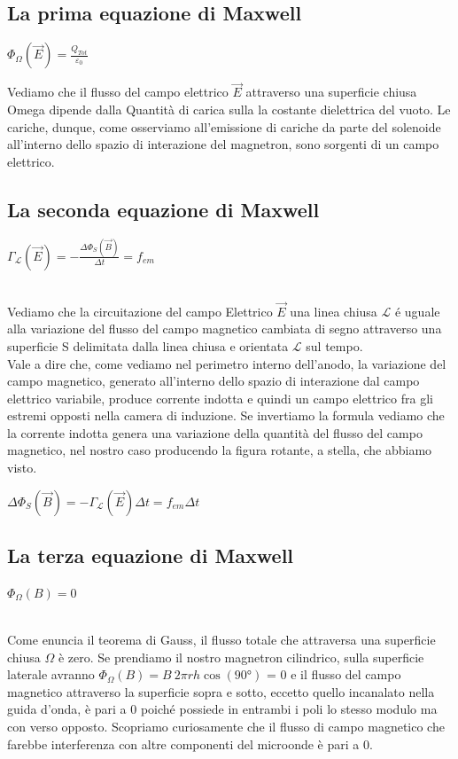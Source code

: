 \documentclass{article}
\begin{document}
\subsection{La prima equazione di Maxwell}
\begin{center}
$\Phi_\Omega (\overrightarrow{E})  = \frac {Q_{Tot}}{\varepsilon_0} $
\end{center}
Vediamo che il flusso del campo elettrico $\overrightarrow{E}$ attraverso una superficie chiusa Omega dipende dalla Quantità di carica sulla la costante dielettrica del vuoto. Le cariche, dunque, come osserviamo all'emissione di cariche da parte del solenoide all'interno dello spazio di interazione del magnetron, sono sorgenti di un campo elettrico.

\subsection{La seconda equazione di Maxwell}
\begin{center}
$\Gamma_{\mathcal{L}} (\overrightarrow{E}) = - \frac{\Delta\Phi_{S}(\overrightarrow{B})}{\Delta t} = f_{em}$
\end{center}
\\ Vediamo che la circuitazione del campo Elettrico $\overrightarrow{E}$ una linea chiusa $\mathcal{L}$ é uguale alla variazione del flusso del campo magnetico cambiata di segno attraverso una superficie S delimitata dalla linea chiusa e orientata $\mathcal{L}$ sul tempo.
\\ Vale a dire che, come vediamo nel perimetro interno dell'anodo, la variazione del campo magnetico, generato all'interno dello spazio di interazione dal campo elettrico variabile, produce corrente indotta e quindi un campo elettrico fra gli estremi opposti nella camera di induzione. 
Se invertiamo la formula vediamo che la corrente indotta genera una variazione della quantità del flusso del campo magnetico, nel nostro caso producendo la figura rotante, a stella, che abbiamo visto.
\begin{center}
$\Delta\Phi_{S}(\overrightarrow{B}) = -  \Gamma_{\mathcal{L}} (\overrightarrow{E}) \Delta t = f_{em}\Delta t$
\end{center}
\subsection{La terza equazione di Maxwell}
\begin{center}
$\Phi_\Omega (B) = 0 $
\end{center}
\\ Come enuncia il teorema di Gauss, il flusso totale che attraversa una superficie chiusa $\Omega$ è zero. Se prendiamo il nostro magnetron cilindrico, sulla superficie laterale avranno $\Phi_\Omega (B) = B \ 2\pi r h  \cos(90°)$ = 0 e il flusso del campo magnetico attraverso la  superficie sopra e sotto, eccetto quello incanalato nella guida d'onda, è pari a 0 poiché possiede in entrambi i poli lo stesso modulo ma con verso opposto. Scopriamo curiosamente che il flusso di campo magnetico che farebbe interferenza con altre componenti del microonde è pari a 0.
\end{document}
